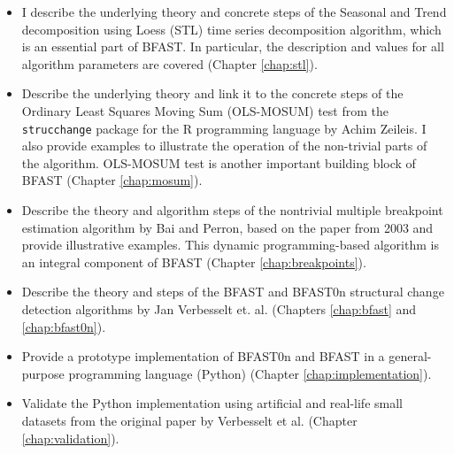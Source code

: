 \documentclass[main.tex]{subfiles}
\begin{document}
\begin{itemize}
\item I describe the underlying theory and concrete steps of the
  Seasonal and Trend decomposition using Loess (STL)
  time series decomposition algorithm, which is an essential part of BFAST.
  In particular, the description and values for all algorithm parameters are
  covered (Chapter \ref{chap:stl}).
\item Describe the underlying theory and link it to the concrete steps of
  the Ordinary Least Squares Moving Sum (OLS-MOSUM) test from the
  \texttt{strucchange} package \cite{strucchange} for the R programming
  language by Achim Zeileis. I also provide examples to illustrate the
  operation of the non-trivial parts of the algorithm. OLS-MOSUM test is another
  important building block of BFAST (Chapter \ref{chap:mosum}).
\item Describe the theory and algorithm steps of the nontrivial multiple
  breakpoint estimation algorithm by Bai and Perron, based on the paper from 2003 \cite{bai_perron}
  and provide illustrative examples. This dynamic programming-based algorithm is
  an integral component of BFAST (Chapter \ref{chap:breakpoints}).
\item Describe the theory and steps of the BFAST and BFAST0n structural change
  detection algorithms by Jan Verbesselt et. al. \cite{bfast} (Chapters
  \ref{chap:bfast} and \ref{chap:bfast0n}).
\item Provide a prototype implementation of BFAST0n and BFAST in a
  general-purpose programming language (Python) (Chapter \ref{chap:implementation}).
\item Validate the Python implementation using artificial and real-life small
  datasets from the original paper by Verbesselt et al. \cite{bfast} (Chapter \ref{chap:validation}).
\end{itemize}

\biblio
\end{document}
